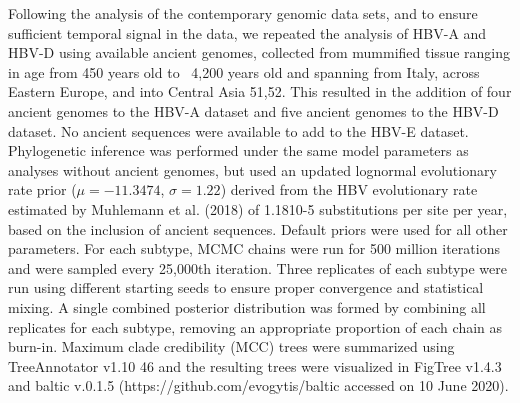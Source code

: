 Following the analysis of the contemporary genomic data sets, and to ensure sufficient temporal signal in the data, we repeated the analysis of HBV-A and HBV-D using available ancient genomes, collected from mummified tissue ranging in age from 450 years old to ~4,200 years old and spanning from Italy, across Eastern Europe, and into Central Asia 51,52. This resulted in the addition of four ancient genomes to the HBV-A dataset and five ancient genomes to the HBV-D dataset. No ancient sequences were available to add to the HBV-E dataset. Phylogenetic inference was performed under the same model parameters as analyses without ancient genomes, but used an updated lognormal evolutionary rate prior ($\mu=-11.3474$, $\sigma=1.22$) derived from the HBV evolutionary rate estimated by Muhlemann et al. (2018) of 1.1810-5 substitutions per site per year, based on the inclusion of ancient sequences. Default priors were used for all other parameters. For each subtype, MCMC chains were run for 500 million iterations and were sampled every 25,000th iteration. Three replicates of each subtype were run using different starting seeds to ensure proper convergence and statistical mixing. A single combined posterior distribution was formed by combining all replicates for each subtype, removing an appropriate proportion of each chain as burn-in. Maximum clade credibility (MCC) trees were summarized using TreeAnnotator v1.10 46 and the resulting trees were visualized in FigTree v1.4.3 and baltic v.0.1.5 (https://github.com/evogytis/baltic accessed on 10 June 2020).

